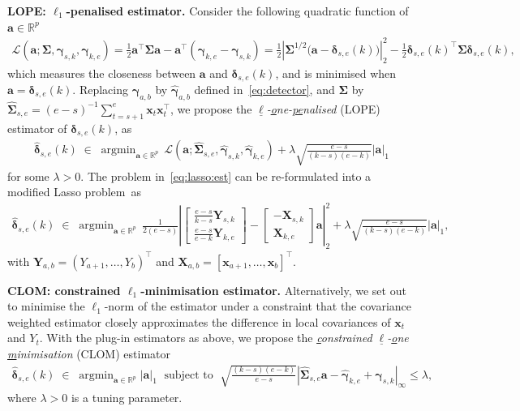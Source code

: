 \documentclass[11pt, a4paper]{article}
\newcommand{\mbf}{\mathbf}
\newcommand{\mc}{\mathcal}
\newcommand{\bmx}{\begin{bmatrix}}
\newcommand{\emx}{\end{bmatrix}}
\renewcommand{\l}{\left}
\renewcommand{\r}{\right}
\def\wh{\widehat}
\newcommand{\R}{\mathbb{R}}
\theoremstyle{definition}
\theoremstyle{definition}
\theoremstyle{definition}
\theoremstyle{definition}
\theoremstyle{definition}
\theoremstyle{remark}
\theoremstyle{definition}
\theoremstyle{definition}
\theoremstyle{definition}
\begin{document}
\textbf{LOPE: $\ell_1$-penalised estimator.} 
Consider the following quadratic function of $\mbf a \in \R^p$
\begin{align*}
\mc L(\mbf a; \bm\Sigma, \bm\gamma_{s, k}, \bm\gamma_{k, e})
=  \frac{1}{2} \mbf a^\top \bm\Sigma \mbf a - \mbf a^\top (\bm\gamma_{k, e} - \bm\gamma_{s, k})
=  \frac{1}{2}\left\vert\bm\Sigma^{1/2}\bigl( \mbf a - \bm\delta_{s, e}(k)\bigr)\right\vert_2^2 - \frac{1}{2}\bm\delta_{s, e}(k)^\top\bm{\Sigma}\bm\delta_{s, e}(k),
\end{align*}
which measures the closeness between $\mbf a$ and $\bm\delta_{s, e}(k)$, and is minimised when $\mbf a = \bm\delta_{s, e}(k)$. 
Replacing $\bm\gamma_{a, b}$ by $\wh{\bm\gamma}_{a, b}$ defined in~\eqref{eq:detector}, and $\bm\Sigma$ by $\wh{\bm\Sigma}_{s, e} = (e - s)^{-1} \sum_{t = s + 1}^e \mbf x_t \mbf x_t^\top$, 
we propose the \emph{$\underline{\ell}$-\underline{o}ne-\underline{pe}nalised} (LOPE) estimator of $\bm\delta_{s, e}(k)$, as
\begin{align}
\label{eq:lasso:est}
\wh{\bm\delta}_{s, e}(k) \;\in\; \mathop{\arg\min}_{\mbf a \in \R^p} \, \mc L\l( \mbf a; \wh{\bm\Sigma}_{s, e}, \wh{\bm\gamma}_{s, k}, \wh{\bm\gamma}_{k, e} \r) + 
\lambda \sqrt{\frac{e-s}{(k-s)(e-k)}} \vert \mbf a \vert_1
\end{align}
for some $\lambda > 0$. The problem in~\eqref{eq:lasso:est} can be re-formulated into a modified Lasso problem~as
\begin{align*}
\wh{\bm\delta}_{s, e}(k) \;\in\; \mathop{\arg\min}_{\mbf a \in \R^p} \, \frac{1}{2(e-s)}\l\vert
\bmx
\frac{e-s}{k-s}\bm Y_{s,k}\\
\frac{e-s}{e-k}\bm Y_{k,e}
\emx
- \bmx
-\mbf X_{s,k} \\
\mbf X_{k,e}
\emx
\mbf a
\r\vert_2^2  + 
\lambda \sqrt{\frac{e-s}{(k-s)(e-k)}} \vert \mbf a \vert_1,
\end{align*}
with $\bm Y_{a, b} = (Y_{a+1}, \ldots, Y_b)^{\top}$ and $\mbf X_{a, b} = [\mbf x_{a+1}, \ldots, \mbf x_b]^\top$. 
\smallskip

\textbf{CLOM: constrained $\ell_1$-minimisation estimator.} Alternatively, we set out to minimise the $\ell_1$-norm of the estimator under a constraint that the covariance weighted estimator closely approximates the difference in local covariances of $\mbf x_t$ and $Y_t$.
With the plug-in estimators as above, we propose the \emph{\underline{c}onstrained $\underline{\ell}$-\underline{o}ne \underline{m}inimisation} (CLOM) estimator 
\begin{align}
\wh{\bm\delta}_{s, e}(k) \;\in\; \mathop{\arg\min}_{\mbf a \in \R^p} \vert \mbf a \vert_1 \;\text{ \ subject to \ }\; \sqrt{\frac{(k - s)(e - k)}{e - s}} \l\vert \wh{\bm\Sigma}_{s, e} \mbf a - \wh{\bm\gamma}_{k, e} + \wh{\bm\gamma}_{s, k} \r\vert_\infty \le \lambda, 
\label{eq:direct:est}
\end{align}
where $\lambda > 0$ is a tuning parameter.
\smallskip
\end{document}
